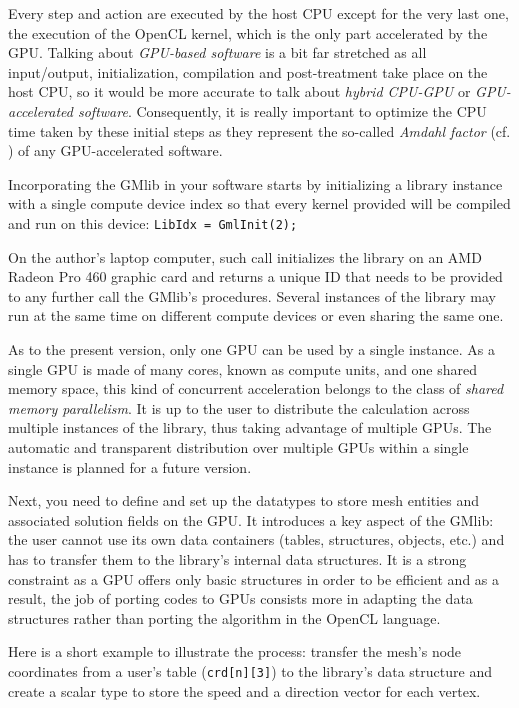 \documentclass[a4paper,12pt]{article}
\begin{document}
Every step and action are executed by the host CPU except for the very last one, the execution of the OpenCL kernel, which is the only part accelerated by the GPU. Talking about \emph{GPU-based software} is a bit far stretched as all input/output, initialization, compilation and post-treatment take place on the host CPU, so it would be more accurate to talk about \emph{hybrid CPU-GPU} or \emph{GPU-accelerated software}. Consequently, it is really important to optimize the CPU time taken by these initial steps as they represent the so-called \emph{Amdahl factor} (cf. \cite{amdahl}) of any GPU-accelerated software.

Incorporating the GMlib in your software starts by initializing a library instance with a single compute device index so that every kernel provided will be compiled and run on this device: {\tt LibIdx = GmlInit(2);}

On the author's laptop computer, such call initializes the library on an AMD Radeon Pro 460 graphic card and returns a unique ID that needs to be provided to any further call the GMlib's procedures. Several instances of the library may run at the same time on different compute devices or even sharing the same one.

As to the present version, only one GPU can be used by a single instance. As a single GPU is made of many cores, known as compute units, and one shared memory space, this kind of concurrent acceleration belongs to the class of \emph{shared memory parallelism}. It is up to the user to distribute the calculation across multiple instances of the library, thus taking advantage of multiple GPUs. The automatic and transparent distribution over multiple GPUs within a single instance is planned for a future version.

Next, you need to define and set up the datatypes to store mesh entities and associated solution fields on the GPU. It introduces a key aspect of the GMlib: the user cannot use its own data containers (tables, structures, objects, etc.) and has to transfer them to the library's internal data structures. It is a strong constraint as a GPU offers only basic structures in order to be efficient and as a result, the job of porting codes to GPUs consists more in adapting the data structures rather than porting the algorithm in the OpenCL language.

Here is a short example to illustrate the process: transfer the mesh's node coordinates from a user's table ({\tt crd[n][3]}) to the library's data structure and create a scalar type to store the speed and a direction vector for each vertex.
\end{document}
